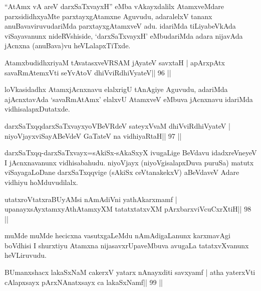 \begin{artha}
``AtAmx vA areV darxSaTxvayxH'' eMba vAkayxdalilx AtamxveMdare   parxsididhxyaMte parxtayxgAtamxne Aguvudu, adaralelxV tananx   anuBavaviruvudariMda parxtayxgAtamxveV adu. idariMda tiLiyabeVkAda   viSayavanunx nideRVshiside, `darxSaTxvayxH' eMbudariMda adara   nijavAda jAcnxna (anuBava)vu heVLalapxTiTxde.
\end{artha}


\begin{shl}
AtamxbudidhxriyaM tAvatasxveVRSAM jAyateV savxtaH |
apArxpAtx savaRmAtemxVti seYvAtoV dhiVviRdhiVyateV\hfill || 96 ||
\end{shl}

\begin{artha}
loVkasidadhx AtamxjAcnxnavu elalxrigU tAnAgiye Aguvudu, adariMda ajAcnxtavAda `savaRmAtAmx' elalxvU AtamxveV eMbuva jAcnxnavu idariMda vidhisalapxDutatxde.
\end{artha}


\begin{shl}
darxSaTxqqdarxSaTxvayxyoVBeVRdeV sateyxVvaM dhiVviRdhiVyateV |
niyoVjayxviSayABeVdeV GaTateV na vidhiyaRtaH\hfill || 97 ||
\end{shl}

\begin{artha}
darxSaTxqq-darxSaTxvayx=sAkiSx-sAkaSxyX ivugaLige BeVdavu
idadxreVneyeV I jAcnxnavanunx vidhisabahudu. niyoVjayx
(niyoVgisalapxDuva puruSa) matutx viSayagaLoDane darxSaTxqqvige
(sAkiSx ceVtanakekxV) aBeVdaveV Adare vidhiyu hoMduvudilalx. 
\end{artha}


\begin{shl}
\footnotemark[1]utatxroVtatxraBUyAMsi nAmAdiVni yathAkarxmamf |
upanayxsAyx\s\s tamxyAthAtamxyXM tatatxtatxvXM pArxbarxviVcuCxrXtiH\hfill || 98 ||
\end{shl}

\begin{artha}
muMde muMde hecicxna vasutxgaLeMdu nAmAdigaLanunx karxmavAgi boVdhisi I shurxtiyu Atamxna nijasavxrUpaveMbuva avugaLa tatatxvXvanunx heVLiruvudu.
\end{artha}

\begin{shl}
BUmanxshacx lakaSxNaM cakerxV yatarx nAnayxditi savxyamf |
atha yaterxVti cAlapxsayx pArxNAnatxsayx ca lakaSxNamf\hfill || 99 ||
\end{shl}


